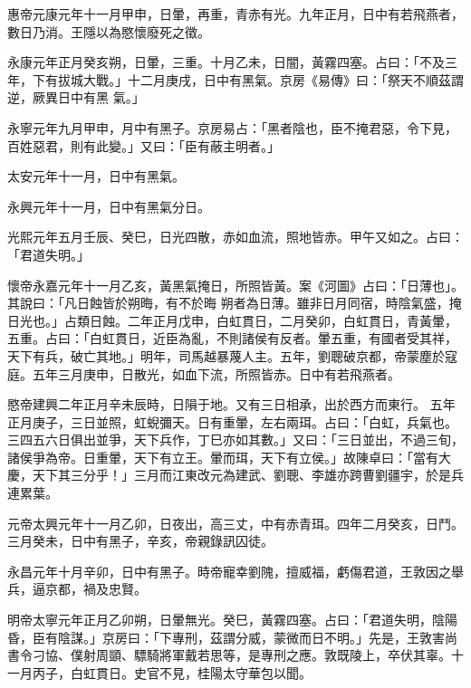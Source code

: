 \begin{pinyinscope}
 惠帝元康元年十一月甲申，日暈，再重，青赤有光。九年正月，日中有若飛燕者，數日乃消。王隱以為愍懷廢死之徵。



 永康元年正月癸亥朔，日暈，三重。十月乙未，日闇，黃霧四塞。占曰：「不及三年，下有拔城大戰。」十二月庚戌，日中有黑氣。京房《易傳》曰：「祭天不順茲謂逆，厥異日中有黑
 氣。」



 永寧元年九月甲申，月中有黑子。京房易占：「黑者陰也，臣不掩君惡，令下見，百姓惡君，則有此變。」又曰：「臣有蔽主明者。」



 太安元年十一月，日中有黑氣。



 永興元年十一月，日中有黑氣分日。



 光熙元年五月壬辰、癸巳，日光四散，赤如血流，照地皆赤。甲午又如之。占曰：「君道失明。」



 懷帝永嘉元年十一月乙亥，黃黑氣掩日，所照皆黃。案《河圖》占曰：「日薄也」。其說曰：「凡日蝕皆於朔晦，有不於晦
 朔者為日薄。雖非日月同宿，時陰氣盛，掩日光也。」占類日蝕。二年正月戊申，白虹貫日，二月癸卯，白虹貫日，青黃暈，五重。占曰：「白虹貫日，近臣為亂，不則諸侯有反者。暈五重，有國者受其祥，天下有兵，破亡其地。」明年，司馬越暴蔑人主。五年，劉聰破京都，帝蒙塵於寇庭。五年三月庚申，日散光，如血下流，所照皆赤。日中有若飛燕者。



 愍帝建興二年正月辛未辰時，日隕于地。又有三日相承，出於西方而東行。
 五年正月庚子，三日並照，虹蜺彌天。日有重暈，左右兩珥。占曰：「白虹，兵氣也。三四五六日俱出並爭，天下兵作，丁巳亦如其數。」又曰：「三日並出，不過三旬，諸侯爭為帝。日重暈，天下有立王。暈而珥，天下有立侯。」故陳卓曰：「當有大慶，天下其三分乎！」三月而江東改元為建武、劉聰、李雄亦跨曹劉疆宇，於是兵連累葉。



 元帝太興元年十一月乙卯，日夜出，高三丈，中有赤青珥。四年二月癸亥，日鬥。三月癸未，日中有黑子，辛亥，帝親錄訊囚徒。



 永昌元年十月辛卯，日中有黑子。時帝寵幸劉隗，擅威福，虧傷君道，王敦因之舉兵，逼京都，禍及忠賢。



 明帝太寧元年正月乙卯朔，日暈無光。癸巳，黃霧四塞。占曰：「君道失明，陰陽昏，臣有陰謀。」京房曰：「下專刑，茲謂分威，蒙微而日不明。」先是，王敦害尚書令刁協、僕射周顗、驃騎將軍戴若思等，是專刑之應。敦既陵上，卒伏其辜。十一月丙子，白虹貫日。史官不見，桂陽太守華包以聞。




\end{pinyinscope}
